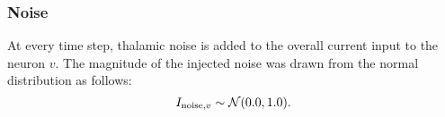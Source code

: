 \subsubsection{Noise}

At every time step, thalamic noise is added to the overall current input to the neuron $v$. The magnitude of the injected noise was drawn from the normal distribution as follows:
\begin{equation}
    I_{\mathrm{noise}, v} \sim \mathcal{N}(0.0, 1.0).
\end{equation}